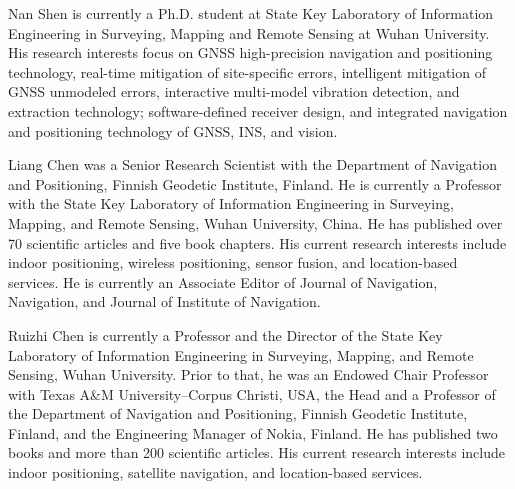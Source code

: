 \documentclass[journal]{IEEEtran}
\begin{document}
	
	\begin{IEEEbiography}
		{Nan Shen}
		is currently a Ph.D. student at State Key Laboratory of Information Engineering in Surveying, Mapping and Remote Sensing at Wuhan University.
		His research interests focus on GNSS high-precision navigation and positioning technology, real-time mitigation of site-specific errors, intelligent mitigation of GNSS unmodeled errors, interactive multi-model vibration detection, and extraction technology; software-defined receiver design, and integrated navigation and positioning technology of GNSS, INS, and vision.
		
	\end{IEEEbiography}
	\begin{IEEEbiography}
		{Liang Chen}
		was a Senior Research Scientist with the Department of Navigation and Positioning, Finnish Geodetic Institute, Finland. He is currently a Professor with the State Key Laboratory of Information Engineering in Surveying, Mapping, and Remote Sensing, Wuhan University, China. He has published over 70 scientific articles and five book chapters. His current research interests include indoor positioning, wireless positioning, sensor fusion, and location-based services. He is currently an Associate Editor of Journal of Navigation, Navigation, and Journal of Institute of Navigation.
	\end{IEEEbiography}
	\begin{IEEEbiography}
		{Ruizhi Chen}
		is currently a Professor and the Director of the State Key Laboratory of Information Engineering in Surveying, Mapping, and Remote Sensing, Wuhan University. Prior to that, he was an Endowed Chair Professor with Texas A\&M University–Corpus Christi, USA, the Head and a Professor of the Department of Navigation and Positioning, Finnish Geodetic Institute, Finland, and the Engineering Manager of Nokia, Finland. He has published two books and more than 200 scientific articles. His current research interests include indoor positioning, satellite navigation, and location-based services.
	\end{IEEEbiography}
	
\end{document}
